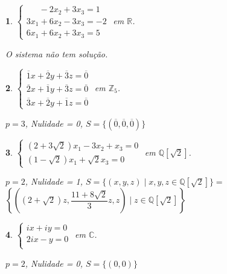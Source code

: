 \documentclass[12pt]{exam}
\newtheorem{exercicio}{}
\newcommand{\integer}{\mathbb{Z}}
\newcommand{\rac}{\mathbb{Q}}
\newcommand{\real}{\mathbb{R}}
\newcommand{\complex}{\mathbb{C}}
\begin{document}
\begin{exercicio}
$\begin{cases}
  \phantom{2x_1} - 2x_2 + 3x_3 = 1\\
  3x_1 + 6x_2 - 3x_3 = -2\\
  6x_1 + 6x_2 + 3x_3 = 5
\end{cases}$ em $\real$.
\begin{solucao}
  O sistema n\~ao tem solu\c{c}\~ao.
\end{solucao}
\end{exercicio}

\begin{exercicio}
$\begin{cases}
  \overline{1}x + \overline{2}y + \overline{3}z = \overline{0}\\
  \overline{2}x + \overline{1}y + \overline{3}z = \overline{0}\\
  \overline{3}x + \overline{2}y + \overline{1}z = \overline{0}
\end{cases}$ em $\integer_5$.
\begin{solucao}
  $p = 3$, Nulidade = 0, $S = \{(\overline{0},\overline{0},\overline{0})\}$
\end{solucao}
\end{exercicio}

\begin{exercicio}
$\begin{cases}
  (2 + 3\sqrt{2})x_1 - 3x_2 + x_3 = 0\\
  (1 - \sqrt{2})x_1 + \sqrt{2}x_3 = 0
\end{cases}$ em $\rac[\sqrt{2}]$.
\begin{solucao}
  $p = 2$, Nulidade = 1, $S = \{(x, y, z) \mid x, y, z \in \rac[\sqrt{2}]\} = $ \\ $\left\{\left((2 + \sqrt{2})z, \dfrac{11 + 8\sqrt{2}}{3}z, z\right) \mid z \in \rac[\sqrt{2}]\right\}$
\end{solucao}
\end{exercicio}

\begin{exercicio}
$\begin{cases}
  ix + iy = 0\\
  2ix - y = 0\\
\end{cases}$ em $\complex$.
\begin{solucao}
  $p = 2$, Nulidade = 0, $S = \{(0, 0)\}$
\end{solucao}
\end{exercicio}
\end{document}

